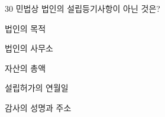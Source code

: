 \begin{question}{30}
민법상 법인의 설립등기사항이 아닌 것은?
\begin{choices}
  \item 법인의 목적
  \item 법인의 사무소
  \item 자산의 총액
  \item 설립허가의 연월일
  \item 감사의 성명과 주소
\end{choices}
\end{question}
